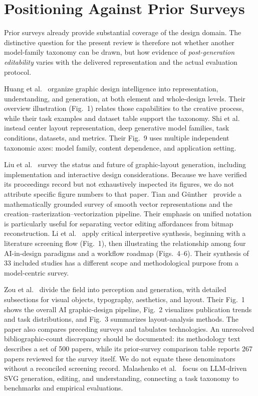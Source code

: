 \section{Positioning Against Prior Surveys}
\label{sec:related}
Prior surveys already provide substantial coverage of the design domain. The distinctive question for the present review is therefore not whether another model-family taxonomy can be drawn, but how evidence of \emph{post-generation editability} varies with the delivered representation and the actual evaluation protocol.

Huang et al.~\citep{huang2023survey} organize graphic design intelligence into representation, understanding, and generation, at both element and whole-design levels. Their overview illustration (Fig.~1) relates those capabilities to the creative process, while their task examples and dataset table support the taxonomy. Shi et al.~\citep{shi2023layoutsurvey} instead center layout representation, deep generative model families, task conditions, datasets, and metrics. Their Fig.~9 uses multiple independent taxonomic axes: model family, content dependence, and application setting.

Liu et al.~\citep{liu2024graphiclayoutsurvey} survey the status and future of graphic-layout generation, including implementation and interactive design considerations. Because we have verified its proceedings record but not exhaustively inspected its figures, we do not attribute specific figure numbers to that paper. Tian and G{\"u}nther~\citep{tian2024vectorsurvey} provide a mathematically grounded survey of smooth vector representations and the creation--rasterization--vectorization pipeline. Their emphasis on unified notation is particularly useful for separating vector editing affordances from bitmap reconstruction. Li et al.~\citep{li2024criticalsurvey} apply critical interpretive synthesis, beginning with a literature screening flow (Fig.~1), then illustrating the relationship among four AI-in-design paradigms and a workflow roadmap (Figs.~4--6). Their synthesis of 33 included studies has a different scope and methodological purpose from a model-centric survey.

Zou et al.~\citep{zou2025fragment} divide the field into perception and generation, with detailed subsections for visual objects, typography, aesthetics, and layout. Their Fig.~1 shows the overall AI graphic-design pipeline, Fig.~2 visualizes publication trends and task distributions, and Fig.~3 summarizes layout-analysis methods. The paper also compares preceding surveys and tabulates technologies. An unresolved bibliographic-count discrepancy should be documented: its methodology text describes a set of 500 papers, while its prior-survey comparison table reports 267 papers reviewed for the survey itself. We do not equate these denominators without a reconciled screening record. Malashenko et al.~\citep{malashenko2025svgreview} focus on LLM-driven SVG generation, editing, and understanding, connecting a task taxonomy to benchmarks and empirical evaluations.

